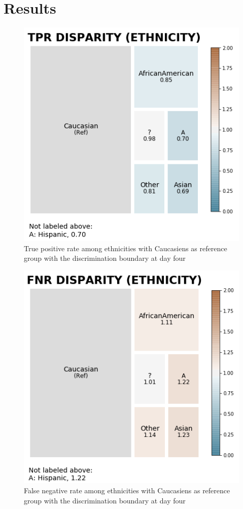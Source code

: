 \documentclass[journal]{IEEEtran}
\begin{document}
%
%
\section{Results} 
\begin{figure}
	\centering
	\includegraphics[width=0.8\linewidth]{../imgs/tpr_paper}
	\caption{True positive rate among ethnicities with Caucasiens as reference group with the discrimination boundary at day four}
	\label{fig:tpr}
\end{figure}

\begin{figure}
	\centering
	\includegraphics[width=0.8\linewidth]{../imgs/fnr_paper}
	\caption{False negative rate among ethnicities with Caucasiens as reference group with the discrimination boundary at day four}
	\label{fig:fpr}
\end{figure}
\end{document}
